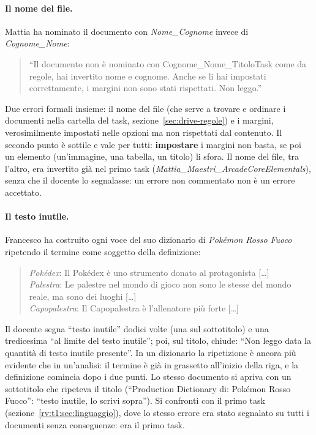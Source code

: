 \paragraph{Il nome del file.} Mattia ha nominato il documento con
\emph{Nome\_Cognome} invece di \emph{Cognome\_Nome}:
\begin{quote}
  ``Il documento non è nominato con Cognome\_\allowbreak Nome\_\allowbreak TitoloTask come da regole,
  hai invertito nome e cognome. Anche se li hai impostati correttamente, i
  margini non sono stati rispettati. Non leggo.''
\end{quote}
Due errori formali insieme: il nome del file (che serve a trovare e ordinare
i documenti nella cartella del task, sezione~\ref{sec:drive-regole}) e i
margini, verosimilmente impostati nelle opzioni ma non rispettati dal
contenuto. Il secondo
punto è sottile e vale per tutti: \textbf{impostare} i margini non basta, se
poi un elemento (un'immagine, una tabella, un titolo) li sfora. Il nome del
file, tra l'altro, era invertito già nel primo task
(\emph{Mattia\_\allowbreak Maestri\_\allowbreak ArcadeCoreElementals}), senza che il docente lo
segnalasse: un errore non commentato non è un errore accettato.

\paragraph{Il testo inutile.} Francesco ha costruito ogni voce del suo
dizionario di \emph{Pokémon Rosso Fuoco} ripetendo il termine come soggetto
della definizione:
\begin{quote}
  \emph{Pokédex}: Il Pokédex è uno strumento donato al protagonista [\dots]\\
  \emph{Palestra}: Le palestre nel mondo di gioco non sono le stesse del mondo
  reale, ma sono dei luoghi [\dots]\\
  \emph{Capopalestra}: Il Capopalestra è l'allenatore più forte [\dots]
\end{quote}
Il docente segna ``testo inutile'' dodici volte (una sul sottotitolo) e una
tredicesima ``al limite del testo inutile''; poi, sul titolo, chiude: ``Non leggo data la quantità di
testo inutile presente''. In un dizionario la ripetizione è ancora più
evidente che in un'analisi: il termine è già in grassetto all'inizio della
riga, e la definizione comincia dopo i due punti. Lo stesso documento si apriva
con un sottotitolo che ripeteva il titolo (``Production Dictionary di: Pokémon
Rosso Fuoco'': ``testo inutile, lo scrivi sopra''). Si confronti con il primo
task (sezione~\ref{rv:t1:sec:linguaggio}), dove lo stesso errore era stato
segnalato su tutti i documenti senza conseguenze: era il primo task.

